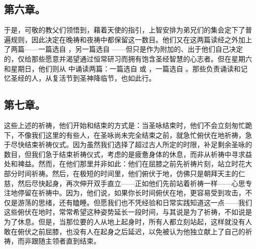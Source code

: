 
\subsection{第六章。}

\par

于是，可敬的教父们领悟到，藉着天使的指引，上智安排为弟兄们的集会定下了普遍规则，因此决定在晚祷和夜祷中都保留这一数目。他们又在这两篇读经之外加上了两篇——一篇选自 ，另一篇选自 ——但只是作为附加的、出于他们自己决定的，仅给那些愿意并渴望通过恒常研习而拥有饱含圣经智慧的心志者。但在星期六和星期日，他们则从  中诵读两篇：一篇选自  或 ，一篇选自 。那些负责诵读和记忆圣经的人，从复活节到圣神降临节，也如此行。\par


\subsection{第七章。}

\par

这些上述的祈祷，他们开始和结束的方式是：当圣咏结束时，他们不会立刻匆忙跪下，不像我们这里的有些人，在圣咏尚未完全结束之前，就急忙俯伏在地祈祷，急于尽快结束祈祷仪式。因为虽然我们选择了超过古人所定的时限，补足剩余圣咏的数目，但我们急于结束祈祷仪式，考虑的是疲惫身体的休息，而非从祈祷中寻求益处和裨益。然而，在他们那里并非如此：他们在屈膝之前先祈祷片刻，站立时花大部分时间祈祷。然后，在极短的时间里，他们俯伏于地，仿佛只是朝拜天主的仁慈，然后尽快起身，再次伸开双手直立——正如他们先前站着祈祷一样——心思专注地停留在祈祷中。因为，他们说，如果你长时间俯伏在地，更容易受到攻击，不仅是游荡的思绪，还有瞌睡。但愿我们也不凭经验和日常实践知道这一点——我们这些俯伏在地时，常常希望这种姿势延长一段时间，与其说是为了祈祷，不如说是为了休息。但是，当那位要的人从地上起身时，所有人都立刻站起，这样就没有人敢在俯伏之前屈膝，也没有人在起身之后延迟，以免被认为他独立献上了自己的祈祷，而非跟随主领者直到结束。\par


